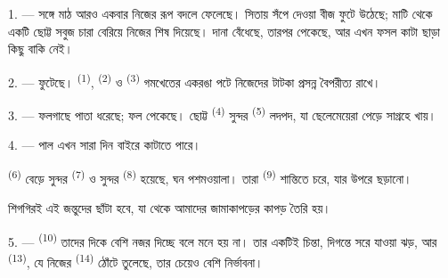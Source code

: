 %


\VUsaut{5.0mm}
\VUsaut{3.0mm}
\VUsaut{3.0mm}
\VUsaut{4.0mm}
\VUsaut{3.0mm}

1. ---  সঙ্গে মাঠ আরও একবার নিজের রূপ বদলে ফেলেছে। সিতায়
সঁপে দেওয়া বীজ ফুটে উঠেছে; মাটি থেকে একটি ছোট্ট সবুজ চারা বেরিয়ে নিজের শিষ
দিয়েছে। দানা বেঁধেছে, তারপর পেকেছে, আর এখন ফসল কাটা ছাড়া কিছু বাকি নেই।

2. ---  ফুটেছে।  \textsuperscript{(1)},
 \textsuperscript{(2)} ও  \textsuperscript{(3)}
গমখেতের একরঙা পটে নিজেদের টাটকা  প্রসন্ন বৈপরীত্য রাখে।

3. --- ফলগাছে পাতা ধরেছে; ফল পেকেছে। ছোট্ট 
\textsuperscript{(4)} সুন্দর  \textsuperscript{(5)} লদপদ, যা
ছেলেমেয়েরা পেড়ে সাগ্রহে খায়।

4. --- পাল এখন সারা দিন বাইরে কাটাতে পারে।

 \textsuperscript{(6)} বেড়ে সুন্দর 
\textsuperscript{(7)} ও সুন্দর  \textsuperscript{(8)} হয়েছে, ঘন
পশমওয়ালা। তারা  \textsuperscript{(9)}  শান্তিতে
চরে, যার উপরে  ছড়ানো।

শিগগিরই এই জন্তুদের  ছাঁটা হবে, যা থেকে আমাদের জামাকাপড়ের কাপড়
তৈরি হয়।

\VUsaut{5.0mm}
\VUsaut{3.4mm}

5. ---  \textsuperscript{(10)} তাদের দিকে বেশি নজর দিচ্ছে বলে মনে
হয় না। তার একটিই চিন্তা, দিগন্তে সরে যাওয়া ঝড়, আর 
\textsuperscript{(13)}, যে নিজের  \textsuperscript{(14)} ঠোঁটে
তুলেছে, তার চেয়েও বেশি নির্ভাবনা।

